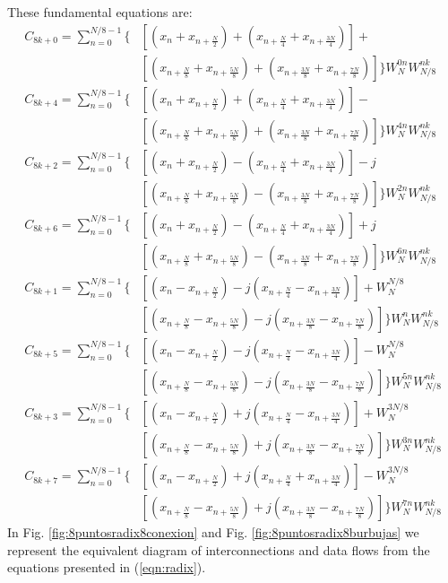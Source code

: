 \documentclass[journal,comsoc]{IEEEtran}
\begin{document}
These fundamental equations are:
\begin{align}\label{eqn:radix}
C_{8k+0} = \sum_{n=0}^{N/8-1} \bigg\{&[(x_n + x_{n+\frac{N}{2}}) + (x_{n+\frac{N}{4}} + x_{n+\frac{3N}{4}})] + 	   				    \\
&[(x_{n+\frac{N}{8}} + x_{n+\frac{5N}{8}}) + (x_{n+\frac{3N}{8}} + x_{n+\frac{7N}{8}})] \bigg\} W_N^{0n} W_{N/8}^ {nk}     \nonumber\\
%	
C_{8k+4} = \sum_{n=0}^{N/8-1} \bigg\{&[(x_n + x_{n+\frac{N}{2}}) + (x_{n+\frac{N}{4}} + x_{n+\frac{3N}{4}})] - 			   \nonumber\\
&[(x_{n+\frac{N}{8}} + x_{n+\frac{5N}{8}}) + (x_{n+\frac{3N}{8}} + x_{n+\frac{7N}{8}})] \bigg\} W_N^{4n} W_{N/8}^ {nk}     \nonumber\\
%
C_{8k+2} = \sum_{n=0}^{N/8-1} \bigg\{&[(x_n + x_{n+\frac{N}{2}}) - (x_{n+\frac{N}{4}} + x_{n+\frac{3N}{4}})] -j 		   \nonumber\\
&[(x_{n+\frac{N}{8}} + x_{n+\frac{5N}{8}}) - (x_{n+\frac{3N}{8}} + x_{n+\frac{7N}{8}})] \bigg\} W_N^{2n} W_{N/8}^ {nk}     \nonumber\\
%
C_{8k+6} = \sum_{n=0}^{N/8-1} \bigg\{&[(x_n + x_{n+\frac{N}{2}}) - (x_{n+\frac{N}{4}} + x_{n+\frac{3N}{4}})] +j			   \nonumber\\
&[(x_{n+\frac{N}{8}} + x_{n+\frac{5N}{8}}) - (x_{n+\frac{3N}{8}} + x_{n+\frac{7N}{8}})] \bigg\} W_N^{6n} W_{N/8}^ {nk}     \nonumber\\
%
C_{8k+1} = \sum_{n=0}^{N/8-1} \bigg\{&[(x_n - x_{n+\frac{N}{2}}) -j (x_{n+\frac{N}{4}} - x_{n+\frac{3N}{4}})] + W_N^{N/8}  \nonumber\\
&[(x_{n+\frac{N}{8}} - x_{n+\frac{5N}{8}}) -j (x_{n+\frac{3N}{8}} - x_{n+\frac{7N}{8}})] \bigg\} W_N^{n} W_{N/8}^ {nk}     \nonumber\\
%
C_{8k+5} = \sum_{n=0}^{N/8-1} \bigg\{&[(x_n - x_{n+\frac{N}{2}}) -j (x_{n+\frac{N}{4}} - x_{n+\frac{3N}{4}})] - W_N^{N/8}  \nonumber\\
&[(x_{n+\frac{N}{8}} - x_{n+\frac{5N}{8}}) -j (x_{n+\frac{3N}{8}} - x_{n+\frac{7N}{8}})] \bigg\} W_N^{5n} W_{N/8}^ {nk}    \nonumber\\
%
C_{8k+3} = \sum_{n=0}^{N/8-1} \bigg\{&[(x_n - x_{n+\frac{N}{2}}) +j (x_{n+\frac{N}{4}} - x_{n+\frac{3N}{4}})] + W_N^{3N/8} \nonumber\\
&[(x_{n+\frac{N}{8}} - x_{n+\frac{5N}{8}}) +j (x_{n+\frac{3N}{8}} - x_{n+\frac{7N}{8}})] \bigg\} W_N^{3n} W_{N/8}^ {nk}    \nonumber\\
%
C_{8k+7} = \sum_{n=0}^{N/8-1} \bigg\{&[(x_n - x_{n+\frac{N}{2}}) +j (x_{n+\frac{N}{4}} + x_{n+\frac{3N}{4}})] - W_N^{3N/8} \nonumber\\
&[(x_{n+\frac{N}{8}} - x_{n+\frac{5N}{8}}) +j (x_{n+\frac{3N}{8}} - x_{n+\frac{7N}{8}})] \bigg\} W_N^{7n} W_{N/8}^ {nk}    \nonumber 	
\end{align}
In Fig. \ref{fig:8puntosradix8conexion} and Fig. \ref{fig:8puntosradix8burbujas} we represent the equivalent diagram of interconnections and data flows from the equations presented in (\ref{eqn:radix}).
\end{document}
